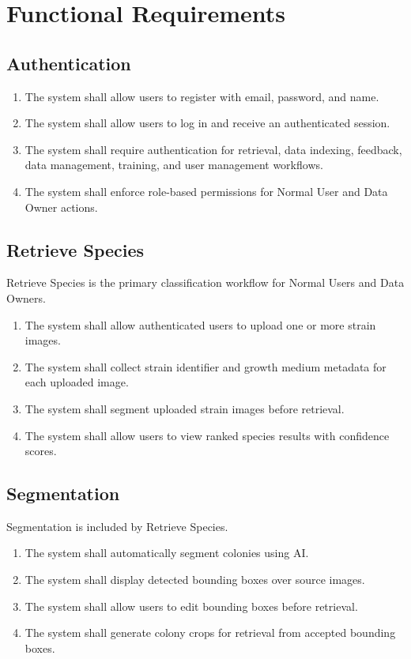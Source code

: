 \documentclass[11pt]{article}
\begin{document}
\section{Functional Requirements}

\subsection{Authentication}

\begin{enumerate}
  \item The system shall allow users to register with email, password, and name.
  \item The system shall allow users to log in and receive an authenticated session.
  \item The system shall require authentication for retrieval, data indexing, feedback, data management, training, and user management workflows.
  \item The system shall enforce role-based permissions for Normal User and Data Owner actions.
\end{enumerate}

\subsection{Retrieve Species}

Retrieve Species is the primary classification workflow for Normal Users and Data Owners.

\begin{enumerate}
  \item The system shall allow authenticated users to upload one or more strain images.
  \item The system shall collect strain identifier and growth medium metadata for each uploaded image.
  \item The system shall segment uploaded strain images before retrieval.
  \item The system shall allow users to view ranked species results with confidence scores.
\end{enumerate}

\subsection{Segmentation}

Segmentation is included by Retrieve Species.

\begin{enumerate}
  \item The system shall automatically segment colonies using AI.
  \item The system shall display detected bounding boxes over source images.
  \item The system shall allow users to edit bounding boxes before retrieval.
  \item The system shall generate colony crops for retrieval from accepted bounding boxes.
\end{enumerate}
\end{document}
